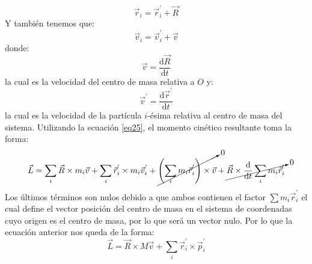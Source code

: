\documentclass[../main]{subfiles}
\begin{document}
    \begin{equation}
        \vec{r}_i=\vec{r}_i^{'}+\vec{R}
        \label{eq25}
    \end{equation}
Y también tenemos que:
    \begin{equation}
        \vec{v}_i=\vec{v}_i^{'}+\vec{v}
        \label{eq26}
    \end{equation}
donde:
    \begin{equation*}
        \vec{v}=\dfrac{\text{d}\vec{R}}{\text{d}t}
    \end{equation*}
la cual es la velocidad del centro de masa relativa a $O$ y:
    \begin{equation*}
        \vec{v}^{'}=\dfrac{\text{d}\vec{r}^{'}}{\text{d}t}
    \end{equation*}
la cual es la velocidad de la partícula $i$-ésima relativa al centro de masa del sistema. Utilizando la ecuación \eqref{eq25}, el momento cinético resultante toma la forma:
    \begin{equation*}
        \vec{L}=\sum_i \vec{R} \times m_i \vec{v}+\sum_i \vec{r}_i^{'}\times m_i \vec{v}_i^{'}+ \cancelto{0}{\left(  \sum_i m_i \vec{r}_i^{'} \right) \times \vec{v}}+\cancelto{0}{\vec{R} \times \dfrac{\text{d}}{\text{d}t} \sum_i m_i \vec{r}_i^{'}}
    \end{equation*}
Los últimos términos son nulos debido a que ambos contienen el factor $\sum m_i \vec{r}_i^{'}$ el cual define el vector posición del centro de masa en el sistema de coordenadas cuyo origen es el centro de masa, por lo que será un vector nulo.
    \vspace{0.2cm}
Por lo que la ecuación anterior nos queda de la forma:
    \begin{equation}
        \vec{L}= \vec{R} \times M \vec{v}+\sum_i  \vec{r}_i^{'} \times \vec{p}_i^{'}
        \label{eq27}
    \end{equation}
    
\end{document}

